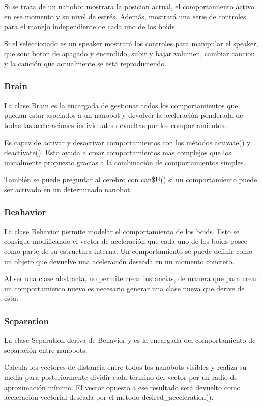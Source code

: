 Si se trata de un nanobot mostrara la posicion actual, el comportamiento activo en ese momento y su nivel de estrés. Además, mostrará una serie de controles para el manejo independiente de cada uno de los boids.

Si el seleccionado es un speaker mostrará los controles para manipular el speaker, que son: boton de apagado y encendido, subir y bajar volumen, cambiar cancion y la canción que actualmente se está reproduciendo.  

\subsubsection{Brain}
\label{sec:brain}
La clase Brain es la encargada de gestionar todos los comportamientos que puedan estar asociados a un nanobot y devolver la aceleración ponderada de todas las aceleraciones individuales devueltas por los comportamientos.

Es capaz de activar y desactivar comportamientos con los métodos activate() y deactivate(). Esto ayuda a crear comportamientos más complejos que los inicialmente propuesto gracias a la combinación de comportamientos simples.

También se puede preguntar al cerebro con can\$U() si un comportamiento puede ser activado en un determinado nanobot.

\subsubsection{Beahavior}
\label{sec:beahavior}
La clase Behavior permite modelar el comportamiento de los boids. Esto se consigue modificando el vector de aceleración que cada uno de los boids posee como parte de su estructura interna. Un comportamiento se puede definir como un objeto que devuelve una aceleración deseada en un momento concreto.

Al ser una clase abstracta, no permite crear instancias, de manera que para crear un comportamiento nuevo es necesario generar una clase nueva que derive de ésta.

\subsubsection{Separation}
\label{sec:separation}
La clase Separation deriva de Behavior y es la encargada del comportamiento de separación entre nanobots.

Calcula  los vectores de distancia entre todos los nanobots visibles y realiza su media para posteriormente dividir cada término del vector por un radio de aproximación mínimo. El vector opuesto a ese resultado será devuelto como aceleración vectorial deseada por el metodo desired\_acceleration().

